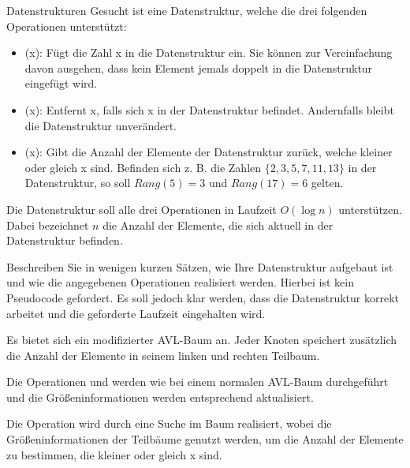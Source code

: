 \documentclass{article}
\begin{document}
\begin{exercise}{Datenstrukturen}
  Gesucht ist eine Datenstruktur, welche die drei folgenden Operationen unterstützt:
  \begin{itemize}
    \item {}(x): Fügt die Zahl x in die Datenstruktur ein. Sie können zur Vereinfachung davon ausgehen, dass kein Element jemals doppelt in die Datenstruktur eingefügt wird.
    \item {}(x): Entfernt x, falls sich x in der Datenstruktur befindet. Andernfalls bleibt die Datenstruktur unverändert.
    \item {}(x): Gibt die Anzahl der Elemente der Datenstruktur zurück, welche kleiner oder gleich x sind. Befinden sich z. B. die Zahlen $\{2,3,5,7,11,13\}$ in der Datenstruktur, so soll $Rang(5) = 3$ und $Rang(17) = 6$ gelten.
  \end{itemize}
  Die Datenstruktur soll alle drei Operationen in Laufzeit $O(\log n)$ unterstützen. Dabei bezeichnet $n$ die Anzahl der Elemente, die sich aktuell in der Datenstruktur befinden.\par
  Beschreiben Sie in wenigen kurzen Sätzen, wie Ihre Datenstruktur aufgebaut ist und wie die angegebenen Operationen realisiert werden. Hierbei ist kein Pseudocode gefordert. Es soll jedoch klar werden, dass die Datenstruktur korrekt arbeitet und die geforderte Laufzeit eingehalten wird.

  \begin{solution}
    Es bietet sich ein modifizierter AVL-Baum an. Jeder Knoten speichert zusätzlich die Anzahl der Elemente in seinem linken und rechten Teilbaum.\par
    Die Operationen  und  werden wie bei einem normalen AVL-Baum durchgeführt und die Größeninformationen werden entsprechend aktualisiert.\par
    Die Operation  wird durch eine Suche im Baum realisiert, wobei die Größeninformationen der Teilbäume genutzt werden, um die Anzahl der Elemente zu bestimmen, die kleiner oder gleich x sind.
  \end{solution}
\end{exercise}
\end{document}
